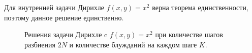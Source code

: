 \documentclass[12pt, a4paper]{article}
\begin{document}
Для внутренней задачи Дирихле $f(x,y) = x^2$ верна теорема единственности, поэтому данное решение единственно.

\begin{figure}[H]
\caption{Решения задачи Дирихле c $f(x,y)=x^2$ при количестве шагов разбиения $2N$ и количестве блужданий на каждом шаге $K$.}
\end{figure}
\end{document}
